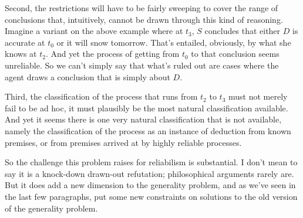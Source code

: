 \documentclass[11pt,oneside]{book}
\begin{document}
Second, the restrictions will have to be fairly sweeping to cover the range of conclusions that, intuitively, cannot be drawn through this kind of reasoning. Imagine a variant on the above example where at $t_3$, $S$ concludes that either $D$ is accurate at $t_0$ or it will snow tomorrow. That's entailed, obviously, by what she knows at $t_2$. And yet the process of getting from $t_0$ to that conclusion seems unreliable. So we can't simply say that what's ruled out are cases where the agent draws a conclusion that is simply about $D$.

Third, the classification of the process that runs from $t_2$ to $t_3$ must not merely fail to be ad hoc, it must plausibly be the most natural classification available. And yet it seems there is one very natural classification that is not available, namely the classification of the process as an instance of deduction from known premises, or from premises arrived at by highly reliable processes.

So the challenge this problem raises for reliabilism is substantial. I don't mean to say it is a knock-down drawn-out refutation; philosophical arguments rarely are. But it does add a new dimension to the generality problem, and as we've seen in the last few paragraphs, put some new constraints on solutions to the old version of the generality problem.



\end{document}
